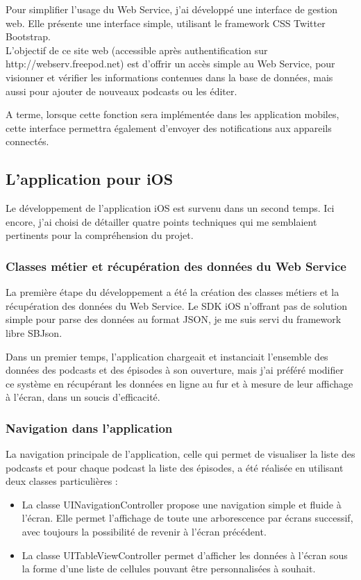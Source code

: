 \documentclass[11pt, french]{report}
\begin{document}
Pour simplifier l'usage du Web Service, j'ai développé une interface de gestion web. Elle présente une interface simple, utilisant le framework CSS Twitter Bootstrap.\\

L'objectif de ce site web (accessible après authentification sur http://webserv.freepod.net) est d'offrir un accès simple au Web Service, pour visionner et vérifier les informations contenues dans la base de données, mais aussi pour ajouter de nouveaux podcasts ou les éditer.

A terme, lorsque cette fonction sera implémentée dans les application mobiles, cette interface permettra également d'envoyer des notifications aux appareils connectés.

\subsection{L'application pour iOS}

Le développement de l'application iOS est survenu dans un second temps. Ici encore, j'ai choisi de détailler quatre points techniques qui me semblaient pertinents pour la compréhension du projet.

\subsubsection{Classes métier et récupération des données du Web Service}

La première étape du développement a été la création des classes métiers et la récupération des données du Web Service. Le SDK iOS n'offrant pas de solution simple pour parse des données au format JSON, je me suis servi du framework libre SBJson.

Dans un premier temps, l'application chargeait et instanciait l'ensemble des données des podcasts et des épisodes à son ouverture, mais j'ai préféré modifier ce système en récupérant les données en ligne au fur et à mesure de leur affichage à l'écran, dans un soucis d'efficacité.

\subsubsection{Navigation dans l'application}

La navigation principale de l'application, celle qui permet de visualiser la liste des podcasts et pour chaque podcast la liste des épisodes, a été réalisée en utilisant deux classes particulières :
\begin{itemize}
	\item La classe UINavigationController propose une navigation simple et fluide à l'écran. Elle permet l'affichage de toute une arborescence par écrans successif, avec toujours la possibilité de revenir à l'écran précédent.
	\item La classe UITableViewController permet d'afficher les données à l'écran sous la forme d'une liste de cellules pouvant être personnalisées à souhait.\\
\end{itemize}
\end{document}
